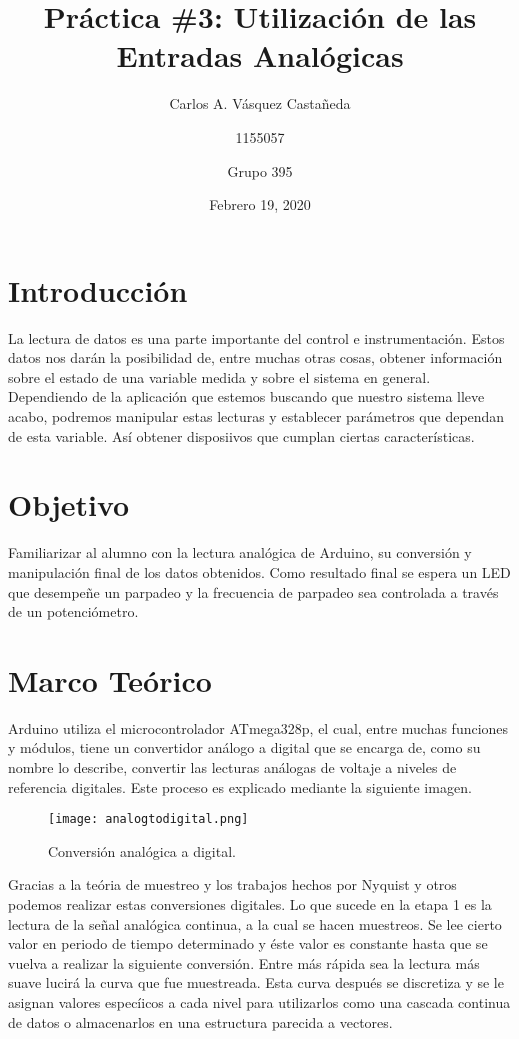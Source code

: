 \documentclass[12pt, letterpaper]{article}
\title{Práctica \#3: Utilización de las Entradas Analógicas}
\author{Carlos A. Vásquez Castañeda \and 1155057 \and Grupo 395}
\date{Febrero 19, 2020}
\begin{document}
\maketitle
\section*{Introducción}
La lectura de datos es una parte importante del control e instrumentación. Estos datos nos darán la posibilidad de, entre muchas otras cosas, obtener información sobre el estado de una variable medida y sobre el sistema en general. Dependiendo de la aplicación que estemos buscando que nuestro sistema lleve acabo, podremos manipular estas lecturas y establecer parámetros que dependan de esta variable. Así obtener disposiivos que cumplan ciertas características.

\section*{Objetivo}
Familiarizar al alumno con la lectura analógica de Arduino, su conversión y manipulación final de los datos obtenidos. Como resultado final se espera un LED que desempeñe un parpadeo y la frecuencia de parpadeo sea controlada a través de un potenciómetro.

\section*{Marco Teórico}
Arduino utiliza el microcontrolador ATmega328p, el cual, entre muchas funciones y módulos, tiene un convertidor análogo a digital que se encarga de, como su nombre lo describe, convertir las lecturas análogas de voltaje a niveles de referencia digitales. Este proceso es explicado mediante la siguiente imagen.

\begin{figure}[H]
	\centering
	\texttt{[image: analogtodigital.png]}
	\caption{Conversión analógica a digital.}
\end{figure}

Gracias a la teória de muestreo y los trabajos hechos por Nyquist y otros podemos realizar estas conversiones digitales. Lo que sucede en la etapa 1 es la lectura de la señal analógica continua, a la cual se hacen muestreos. Se lee cierto valor en periodo de tiempo determinado y éste valor es constante hasta que se vuelva a realizar la siguiente conversión. Entre más rápida sea la lectura más suave lucirá la curva que fue muestreada. Esta curva después se discretiza y se le asignan valores especíicos a cada nivel para utilizarlos como una cascada continua de datos o almacenarlos en una estructura parecida a vectores.
\end{document}
